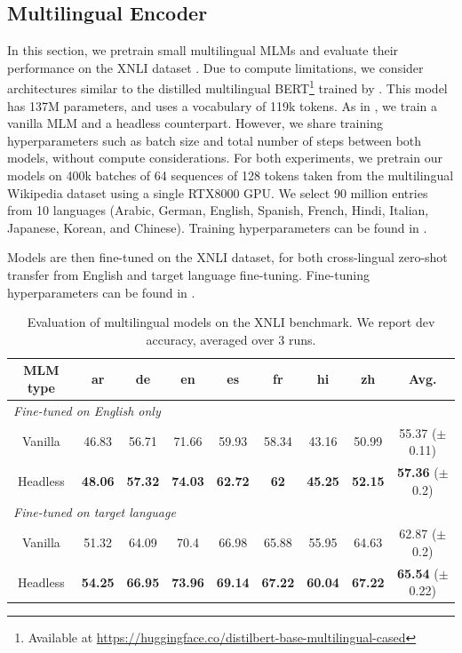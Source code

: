 \subsection{Multilingual Encoder}
\label{sec:multi_mlm}
In this section, we pretrain small multilingual MLMs and evaluate their performance on the XNLI dataset \citep{conneau2018xnli}. 
%
Due to compute limitations, we consider architectures similar to the distilled multilingual BERT\footnote{Available at \url{https://huggingface.co/distilbert-base-multilingual-cased}} trained by \citet{sanh2019distilbert}. This model has 137M parameters, and uses a vocabulary of 119k tokens. As in , we train a vanilla MLM and a headless counterpart. However, we share training hyperparameters such as batch size and total number of steps between both models, without compute considerations. For both experiments, we pretrain our models on 400k batches of 64 sequences of 128 tokens taken from the multilingual Wikipedia dataset using a single RTX8000 GPU. We select 90 million entries from 10 languages (Arabic, German, English, Spanish, French, Hindi, Italian, Japanese, Korean, and Chinese). Training hyperparameters can be found in .

Models are then fine-tuned on the XNLI dataset, for both cross-lingual zero-shot transfer from English and target language fine-tuning. Fine-tuning hyperparameters can be found in .

\begin{table}[h]
\scriptsize
\centering
\begin{tabular}{c|cccccccc}
\toprule
MLM type        & ar             & de             & en             & es             & fr          & hi             & zh             & Avg.           \\ \midrule
\multicolumn{9}{l}{\textit{Fine-tuned on English only}} \\ \midrule
Vanilla  & 46.83          & 56.71          & 71.66          & 59.93          & 58.34       & 43.16          & 50.99          & 55.37 \tiny{($\pm$0.11)}          \\ 
Headless & \textbf{48.06} & \textbf{57.32} & \textbf{74.03} & \textbf{62.72} & \textbf{62} & \textbf{45.25} & \textbf{52.15} & \textbf{57.36} \tiny{($\pm$0.2)} \\ \midrule
\multicolumn{9}{l}{\textit{Fine-tuned on target language}} \\ \midrule
Vanilla  & 51.32          & 64.09          & 70.4           & 66.98          & 65.88          & 55.95 & 64.63          & 62.87 \tiny{($\pm$0.2)}         \\ 
Headless & \textbf{54.25} & \textbf{66.95} & \textbf{73.96} & \textbf{69.14} & \textbf{67.22} & \textbf{60.04} & \textbf{67.22} & \textbf{65.54} \tiny{($\pm$0.22)} \\ \bottomrule
\end{tabular}
\caption{Evaluation of multilingual models on the XNLI benchmark. We report dev accuracy, averaged over 3 runs.}
\end{table}

